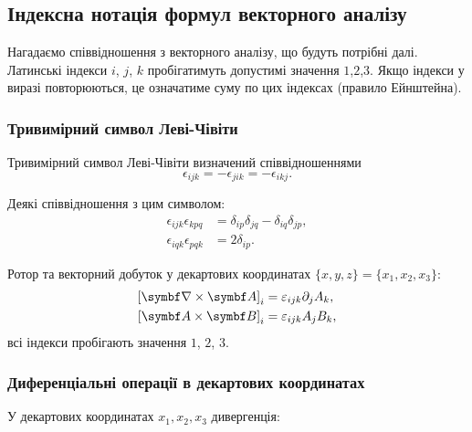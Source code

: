 \subsection{Індексна нотація формул векторного аналізу}

Нагадаємо співвідношення з векторного аналізу, що будуть потрібні далі.
Латинські індекси $i$, $j$, $k$ пробігатимуть допустимі значення $1$,$2$,$3$. Якщо індекси
у виразі повторюються, це означатиме суму по цих індексах (правило
Ейнштейна).

\subsubsection{Тривимірний символ Леві-Чівіти}\label{Levi-Chiv}

Тривимірний символ Леві-Чівіти визначений співвідношеннями
\begin{equation}\label{eq:Levi-Chiv}
\epsilon_{ijk} =  - \epsilon_{jik} =  - \epsilon_{ikj}.
\end{equation}

Деякі співвідношення з цим символом:
\begin{align}
    \epsilon_{ijk}\epsilon_{kpq} &= \delta_{ip}\delta_{jq} - \delta_{iq}\delta_{jp}, \\
    \epsilon_{iqk}\epsilon_{pqk} &= 2\delta _{ip}.
\end{align}

Ротор та векторний добуток у декартових координатах $\{x,y,z\} = \{x_1, x_2, x_3\}$:
\begin{align}
\left[\rot\vect{A} \right]_i &= \epsilon_{ijk}{\partial_j}{A_k}, \\
\left[ \vect{A} \times \Bfield \right]_i &= \epsilon_{ijk}{A_j}{B_k},
\end{align}
всі індекси пробігають значення $1$, $2$, $3$.

\subsubsection{Диференціальні операції в декартових координатах}


У декартових координатах \( x_1, x_2, x_3 \) дивергенція:

